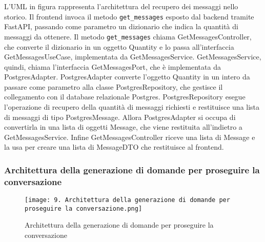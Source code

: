 L'UML in figura rappresenta l'architettura del recupero dei messaggi nello storico.
Il frontend invoca il metodo \texttt{get\_messages} esposto dal backend tramite FastAPI, passando come parametro un dizionario che indica la quantità di messaggi da ottenere.
Il metodo \texttt{get\_messages} chiama GetMessagesController, che converte il dizionario in un oggetto Quantity e lo passa all'interfaccia GetMessagesUseCase, implementata da GetMessagesService.
GetMessagesService, quindi, chiama l'interfaccia GetMessagesPort, che è implementata da PostgresAdapter.
PostgresAdapter converte l'oggetto Quantity in un intero da passare come parametro alla classe PostgresRepository, che gestisce il collegamento con il database relazionale Postgres. 
PostgresRepository esegue l’operazione di recupero della quantità di messaggi richiesti e restituisce una lista di messaggi di tipo PostgresMessage.
Allora PostgresAdapter si occupa di convertirla in una lista di oggetti Message, che viene restituita all'indietro a GetMessagesService.
Infine GetMessagesController riceve una lista di Message e la usa per creare una lista di MessageDTO che restituisce al frontend.

\newpage


\subsubsection{Architettura della generazione di domande per proseguire la conversazione}
\label{sec:architettura_generazione_domande_conversazione}

\begin{figure}[h]
    \centering
    \texttt{[image: 9. Architettura della generazione di domande per proseguire la conversazione.png]}
    \caption{Architettura della generazione di domande per proseguire la conversazione}
\end{figure}

